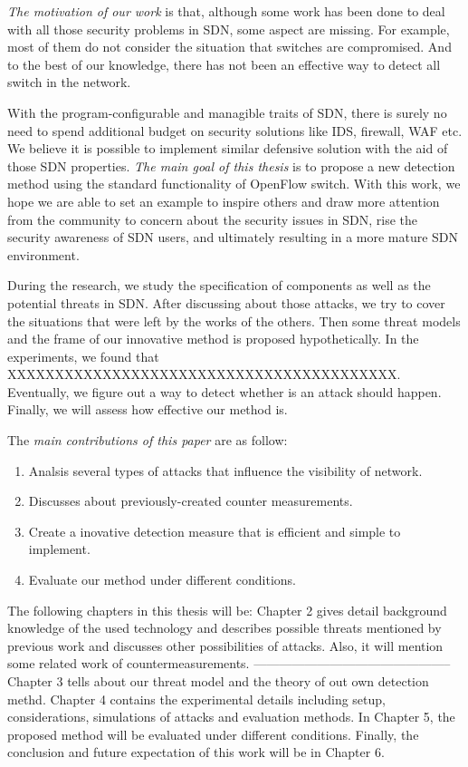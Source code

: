 \emph{The motivation of our work} is that, although some work has been done to deal with all those security problems in SDN\cite{PNV,HTD}, some aspect are missing. For example, most of them do not consider the situation that switches are compromised. And to the best of our knowledge, there has not been an effective way to detect all switch in the network. 

With the program-configurable and managible traits of SDN, there is surely no need to spend additional budget on security solutions like IDS, firewall, WAF etc. We believe it is possible to implement similar defensive solution with the aid of those SDN properties. \emph{The main goal of this thesis} is to propose a new detection method using the standard functionality of OpenFlow switch. With this work, we hope we are able to set an example to inspire others and draw more attention from the community to concern about the security issues in SDN, rise the security awareness of SDN users, and ultimately resulting in a more mature SDN environment.

During the research, we study the specification of components as well as the potential threats in SDN. After discussing about those attacks, we try to cover the situations that were left by the works of the others. Then some threat models and the frame of our innovative method is proposed hypothetically. 
In the experiments, we found that XXXXXXXXXXXXXXXXXXXXXXXXXXXXXXXXXXXXXXXXX. Eventually, we figure out a way to detect whether is an attack should happen. Finally, we will assess how effective our method is.

The \emph{main contributions of this paper} are as follow:

\begin{enumerate}
\item
Analsis several types of attacks that influence the visibility of network.
\item
Discusses about previously-created counter measurements.
\item
Create a inovative detection measure that is efficient and simple to implement.
\item
Evaluate our method under different conditions.
\end{enumerate}

The following chapters in this thesis will be: Chapter 2 gives detail background knowledge of the used technology and describes possible threats mentioned by previous work and discusses other possibilities of attacks. Also, it will mention some related work of countermeasurements. 
-----------------------------------------------
Chapter 3 tells about our threat model and the theory of out own detection methd. Chapter 4 contains the experimental details including setup, considerations, simulations of attacks and evaluation methods. In Chapter 5, the proposed method will be evaluated under different conditions. Finally, the conclusion and future expectation of this work will be in Chapter 6.
